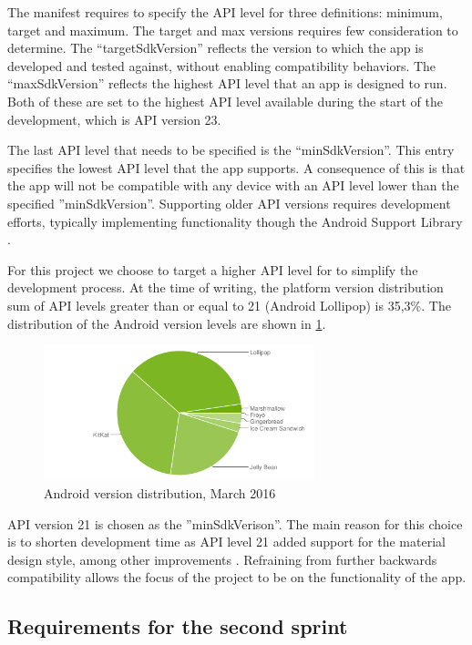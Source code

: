 The manifest requires to specify the API level for three definitions: minimum, target and maximum.
The target and max versions requires few consideration to determine.
The ``targetSdkVersion'' reflects the version to which the app is developed and tested against, without enabling compatibility behaviors.
The ``maxSdkVersion'' reflects the highest API level that an app is designed to run.
Both of these are set to the highest API level available during the start of the development, which is API version 23.

The last API level that needs to be specified is the ``minSdkVersion''.
This entry specifies the lowest API level that the app supports.
A consequence of this is that the app will not be compatible with any device with an API level lower than the specified ''minSdkVersion''.
Supporting older API versions requires development efforts, typically implementing functionality though the Android Support Library \cite{androidSL}.

For this project we choose to target a higher API level for to simplify the development process.
At the time of writing, the platform version distribution sum of API levels greater than or equal to 21 (Android Lollipop) is 35,3\%.
The distribution of the Android version levels are shown in \ref{fig:dashboard}.

\begin{figure}[h]
	\begin{center}
	\includegraphics[width=0.7\textwidth]{figures/android-chart-march.png}
	\end{center}
	\caption{Android version distribution, March 2016 \cite{androidDashboard}}
	\label{fig:dashboard}
\end{figure}

API version 21 is chosen as the ''minSdkVerison''. 
The main reason for this choice is to shorten development time as API level 21 added support for the material design style, among other improvements \cite{android5API}. 
Refraining from further backwards compatibility allows the focus of the project to be on the functionality of the app. 






\subsection{Requirements for the second sprint}
